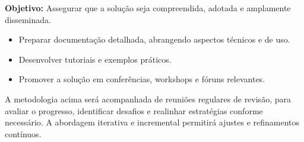 \textbf{Objetivo:} Assegurar que a solução seja compreendida, adotada e amplamente disseminada.

\begin{itemize}
\item Preparar documentação detalhada, abrangendo aspectos técnicos e de uso.
\item Desenvolver tutoriais e exemplos práticos.
\item Promover a solução em conferências, workshops e fóruns relevantes.
\end{itemize}

A metodologia acima será acompanhada de reuniões regulares de revisão, para avaliar o progresso, identificar desafios e realinhar estratégias conforme necessário. A abordagem iterativa e incremental permitirá ajustes e refinamentos contínuos.